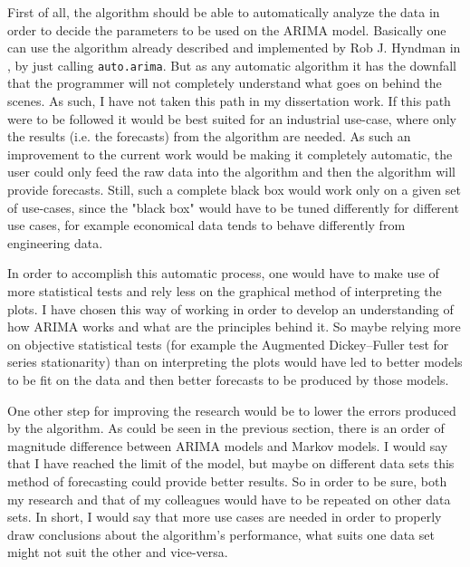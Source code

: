 \documentclass[12pt,a4paper,titlepage]{report}
\begin{document}
First of all, the algorithm should be able to automatically analyze the data in order to decide the parameters to be used on the ARIMA model. Basically one can use the algorithm already described and implemented by Rob J. Hyndman in \cite{fpp2arimainr}, by just calling \texttt{auto.arima}.
But as any automatic algorithm it has the downfall that the programmer will not completely understand what goes on behind the scenes. As such, I have not taken this path in my dissertation work. If this path were to be followed it would be best suited for an industrial use-case, where only the results (i.e. the forecasts) from the algorithm are needed. As such an improvement to the current work would be making it completely automatic, the user could only feed the raw data into the algorithm and then the algorithm will provide forecasts. Still, such a complete black box would work only on a given set of use-cases, since the "black box" would have to be tuned differently for different use cases, for example economical data tends to behave differently from engineering data.

In order to accomplish this automatic process, one would have to make use of more statistical tests and rely less on the graphical method of interpreting the plots. I have chosen this way of working in order to develop an understanding of how ARIMA works and what are the principles behind it. So maybe relying more on objective statistical tests (for example the Augmented Dickey–Fuller test for series stationarity) than on interpreting the plots would have led to better models to be fit on the data and then better forecasts to be produced by those models.

One other step for improving the research would be to lower the errors produced by the algorithm. As could be seen in the previous section, there is an order of magnitude difference between ARIMA models and Markov models. I would say that I have reached the limit of the model, but maybe on different data sets this method of forecasting could provide better results. So in order to be sure, both my research and that of my colleagues would have to be repeated on other data sets. In short, I would say that more use cases are needed in order to properly draw conclusions about the algorithm's performance, what suits one data set might not suit the other and vice-versa.
\end{document}
